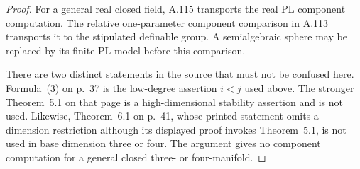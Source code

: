 \begin{proof}
For a general real closed field, A.115 transports the real PL
component computation. The relative one-parameter component
comparison in A.113 transports it to the stipulated definable
group. A semialgebraic sphere may be replaced by its finite PL
model before this comparison.

There are two distinct statements in the source that must not be
confused here. Formula~(3) on p.~37 is the low-degree assertion
$i<j$ used above. The stronger Theorem~5.1 on that page is a
high-dimensional stability assertion and is not used. Likewise,
Theorem~6.1 on p.~41, whose printed statement omits a dimension
restriction although its displayed proof invokes Theorem~5.1,
is not used in base dimension three or four. The argument gives
no component computation for a general closed three- or
four-manifold.
\end{proof}
